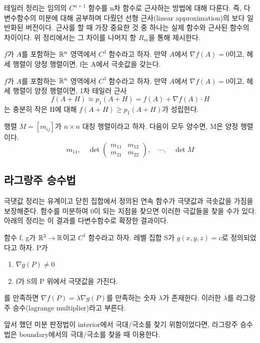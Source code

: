 테일러 정리는 임의의 $C^{n+1}$ 함수를 n차 함수로 근사하는 방법에 대해 다룬다. 즉, 다변수함수의 미분에 대해 공부하며 다뤘던 선형 근사(linear approximation)의 보다 일반화된 버전이다. 근사를 할 때 가장 중요한 것 중 하나는 실제 함수와 근사된 함수의 차이이다. 위 정리에서는 그 차이를 나머지 항 $R_m$을 통해 제시한다.

\begin{theorem}
$f$가 $A$를 포함하는 $\mathbb{R}^n$ 영역에서 $C^3$ 함수라고 하자. 만약 $A$에서 $\nabla f(A)=0$이고, 헤세 행렬이 양정 행렬이면, f는 A에서 극솟값을 갖는다.
\end{theorem}

\begin{theorem}
$f$가 $A$를 포함하는 $\mathbb{R}^n$ 영역에서 $C^3$ 함수라고 하자. 만약 $A$에서 $\nabla f(A)=0$이고, 헤세 행렬이 양정 행렬이면, 1차 테일러 근사
$$
f(A+H) \approx p_1(A+H) = f(A) + \nabla f(A) \cdot H
$$
는 충분히 작은 H에 대해 $f(A+H) \geq p_1(A+H)$가 성립한다.
\end{theorem}

\begin{theorem}
행렬 $M=[m_{ij}]$가 $n \times n$ 대칭 행렬이라고 하자. 다음이 모두 양수면, M은 양정 행렬이다.
$$
m_{11}, \quad \det \begin{pmatrix}
m_{11} & m_{12} \\ m_{21} & m_{22}
\end{pmatrix}, \quad \cdots, \quad \det M
$$
\end{theorem}

\subsection{라그랑주 승수법}
극댓값 정리는 유계이고 닫힌 집합에서 정의된 연속 함수가 극댓값과 극솟값을 가짐을 보장해준다. 함수를 미분하여 0이 되는 지점을 찾으면 이러한 극값들을 찾을 수가 있다. 아래의 정리는 이 결과를 다변수함수로 확장한 결과이다.

\begin{theorem}
함수 f, g가 $\mathbb{R}^3 \to \mathbb{R}$이고 $C^1$ 함수라고 하자. 레벨 집합 S가 $g(x,y,z)=c$로 정의되었다고 하자. P가
\begin{enumerate}[label=(\alph*)]
    \item $\nabla g(P) \neq 0$
    \item f가 S의 P 위에서 극댓값을 가진다.
\end{enumerate}
를 만족하면 $\nabla f(P) = \lambda \nabla g(P)$를 만족하는 숫자 $\lambda$가 존재한다. 이러한 $\lambda$를 라그랑주 승수(lagrange multiplier)라고 부른다.
\end{theorem}
앞서 했던 미분 판정법이 interior에서 극대/극소를 찾기 위함이었다면, 라그랑주 승수법은 boundary에서의 극대/극소를 찾을 때 이용한다.
